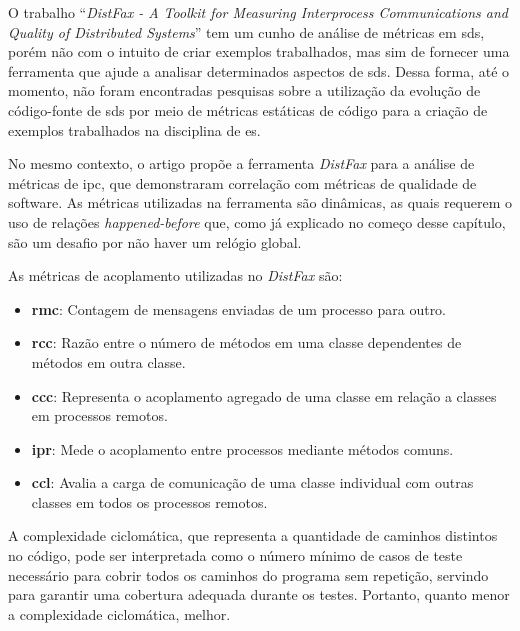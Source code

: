 O trabalho ``\textit{DistFax - A Toolkit for Measuring Interprocess Communications and Quality of Distributed Systems}''\cite{DistFax} tem um cunho de análise de métricas em \gls{sds}, porém não com o intuito de criar exemplos trabalhados, mas sim de fornecer uma ferramenta que ajude a analisar determinados aspectos de \gls{sds}. Dessa forma, até o momento, não foram encontradas pesquisas sobre a utilização da evolução de código-fonte de \gls{sds} por meio de métricas estáticas de código para a criação de exemplos trabalhados na disciplina de \gls{es}.

No mesmo contexto, o artigo propõe a ferramenta \textit{DistFax} para a análise de métricas de \gls{ipc}, que demonstraram correlação com métricas de qualidade de software. As métricas utilizadas na ferramenta são dinâmicas, as quais requerem o uso de relações \textit{happened-before} que, como já explicado no começo desse capítulo, são um desafio por não haver um relógio global.

As métricas de acoplamento utilizadas no \textit{DistFax} são:
\begin{itemize}
    \item \textbf{\gls{rmc}}: Contagem de mensagens enviadas de um processo para outro.
    \item \textbf{\gls{rcc}}: Razão entre o número de métodos em uma classe dependentes de métodos em outra classe.
    \item \textbf{\gls{ccc}}: Representa o acoplamento agregado de uma classe em relação a classes em processos remotos.
    \item \textbf{\gls{ipr}}: Mede o acoplamento entre processos mediante métodos comuns.
    \item \textbf{\gls{ccl}}: Avalia a carga de comunicação de uma classe individual com outras classes em todos os processos remotos.
\end{itemize}

A complexidade ciclomática, que representa a quantidade de caminhos distintos no código, pode ser interpretada como o número mínimo de casos de teste necessário para cobrir todos os caminhos do programa sem repetição, servindo para garantir uma cobertura adequada durante os testes. Portanto, quanto menor a complexidade ciclomática, melhor.


